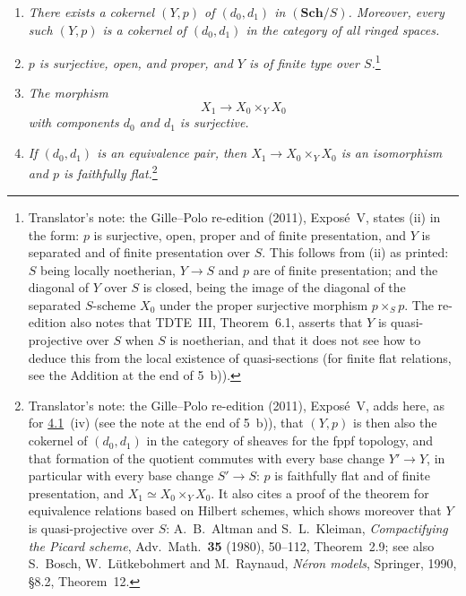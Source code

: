 \begin{enumerate}
\item[(i)]\label{thm:sga3-V-7.1-i}%
  \emph{There exists a cokernel \((Y,p)\) of \((d_0,d_1)\) in
  \((\mathbf{Sch}/S)\). Moreover, every such \((Y,p)\) is a cokernel
  of \((d_0,d_1)\) in the category of all ringed spaces.}
\item[(ii)]\label{thm:sga3-V-7.1-ii}%
  \emph{\(p\) is surjective, open, and proper, and \(Y\) is of finite type
  over \(S\).}\footnote{Translator's note: the Gille--Polo re-edition (2011), Exposé~V, states
  (ii) in the form: \(p\) is surjective, open, proper and of finite
  presentation, and \(Y\) is separated and of finite presentation over \(S\).
  This follows from (ii) as printed: \(S\) being locally noetherian, \(Y\to S\)
  and \(p\) are of finite presentation; and the diagonal of \(Y\) over \(S\) is
  closed, being the image of the diagonal of the separated \(S\)-scheme
  \(X_0\) under the proper surjective morphism \(p\times_Sp\). The
  re-edition also notes that TDTE~III, Theorem~6.1, asserts that \(Y\) is
  quasi-projective over \(S\) when \(S\) is noetherian, and that it does not
  see how to deduce this from the local existence of quasi-sections (for
  finite flat relations, see the Addition at the end of 5~b)).}
\item[(iii)]\label{thm:sga3-V-7.1-iii}%
  \emph{The morphism
  \[
    X_1\longrightarrow X_0\times_Y X_0
  \]
  with components \(d_0\) and \(d_1\) is surjective.}
\item[(iv)]\label{thm:sga3-V-7.1-iv}%
  \emph{If \((d_0,d_1)\) is an equivalence pair, then
  \(X_1\to X_0\times_Y X_0\) is an isomorphism and \(p\) is
  faithfully flat.}\footnote{Translator's note: the Gille--Polo re-edition (2011), Exposé~V, adds
  here, as for \hyperref[thm:sga3-V-4.1]{4.1}~(iv) (see the note at the end of 5~b)), that \((Y,p)\)
  is then also the cokernel of \((d_0,d_1)\) in the category of sheaves for
  the fppf topology, and that formation of the quotient commutes with every
  base change \(Y'\to Y\), in particular with every base change \(S'\to S\):
  \(p\) is faithfully flat and of finite presentation, and
  \(X_1\simeq X_0\times_YX_0\). It also cites a proof of the theorem for
  equivalence relations based on Hilbert schemes, which shows moreover that
  \(Y\) is quasi-projective over \(S\): A.~B.~Altman and S.~L.~Kleiman,
  \emph{Compactifying the Picard scheme}, Adv.\ Math.\ \textbf{35} (1980),
  50--112, Theorem~2.9; see also S.~Bosch, W.~Lütkebohmert and M.~Raynaud,
  \emph{Néron models}, Springer, 1990, \S8.2, Theorem~12.}
\end{enumerate}

